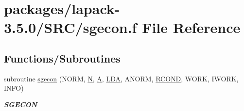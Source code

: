 \hypertarget{sgecon_8f}{}\section{packages/lapack-\/3.5.0/\+S\+R\+C/sgecon.f File Reference}
\label{sgecon_8f}
\subsection*{Functions/\+Subroutines}
\begin{DoxyCompactItemize}
\item 
subroutine \hyperlink{group__realGEcomputational_ga89f21d7700aaccc5fc72ca3316c33463}{sgecon} (N\+O\+R\+M, \hyperlink{polmisc_8c_a0240ac851181b84ac374872dc5434ee4}{N}, \hyperlink{classA}{A}, \hyperlink{example__user_8c_ae946da542ce0db94dced19b2ecefd1aa}{L\+D\+A}, A\+N\+O\+R\+M, \hyperlink{superlu__enum__consts_8h_af00a42ecad444bbda75cde1b64bd7e72a9b5c151728d8512307565994c89919d5}{R\+C\+O\+N\+D}, W\+O\+R\+K, I\+W\+O\+R\+K, I\+N\+F\+O)
\begin{DoxyCompactList}\small\item\em {\bfseries S\+G\+E\+C\+O\+N} \end{DoxyCompactList}\end{DoxyCompactItemize}

